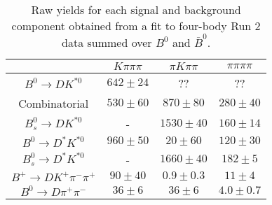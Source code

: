 \begin{table}
  \centering
  \begin{tabular}{cccc}
      \toprule
       & $K\pi\pi\pi$ & $\pi K\pi\pi$ & $\pi\pi\pi\pi$ \\
      \midrule
      $B^0 \to DK^{*0}$ & $642 \pm 24$ & ?? & ?? \\
      Combinatorial & $530 \pm 60$ & $870 \pm 80$ & $280 \pm 40$ \\
      $B^0_s \to DK^{*0}$ & \-- & $1530 \pm 40$ & $160 \pm 14$ \\
      $B^0 \to D^*K^{*0}$ & $960 \pm 50$ & $20 \pm 60$ & $120 \pm 30$ \\
      $B^0_s \to D^*K^{*0}$ & \-- & $1660 \pm 40$ & $182 \pm 5$ \\
      $B^+ \to DK^+\pi^-\pi^+$ & $90 \pm 40$ & $0.9 \pm 0.3$ & $11 \pm 4$ \\
      $B^0 \to D\pi^+\pi^-$ & $36 \pm 6$ & $36 \pm 6$ & $4.0 \pm 0.7$ \\
      \bottomrule
      \end{tabular}
  \caption{Raw yields for each signal and background component obtained from a fit to four-body Run 2 data summed over $B^0$ and $\bar{B}^0$.}
\label{tab:yields_combined_4body_run2}
\end{table}
